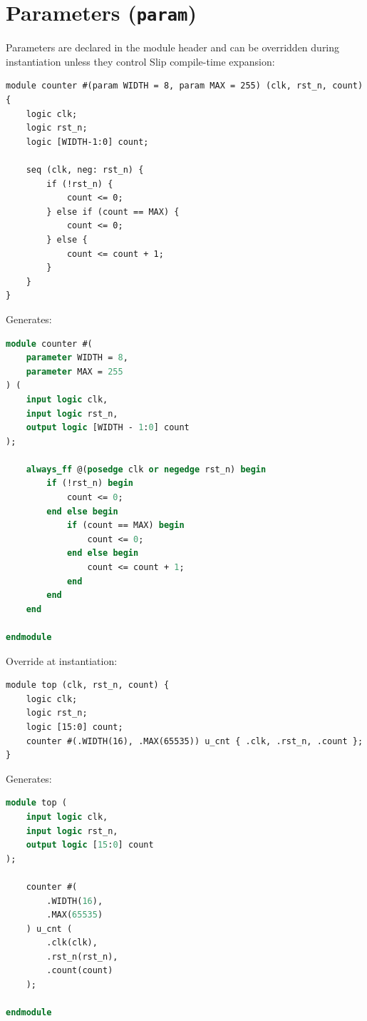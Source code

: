 \documentclass[lang=en,11pt]{elegantbook}
\newcommand{\code}[1]{\texttt{#1}}
\begin{document}
\section{Parameters (\code{param})}

Parameters are declared in the module header and can be overridden during instantiation unless they control Slip compile-time expansion:

\begin{lstlisting}[language=Slip]
module counter #(param WIDTH = 8, param MAX = 255) (clk, rst_n, count) {
    logic clk;
    logic rst_n;
    logic [WIDTH-1:0] count;

    seq (clk, neg: rst_n) {
        if (!rst_n) {
            count <= 0;
        } else if (count == MAX) {
            count <= 0;
        } else {
            count <= count + 1;
        }
    }
}
\end{lstlisting}

Generates:

\begin{lstlisting}[language=SystemVerilog]
module counter #(
    parameter WIDTH = 8,
    parameter MAX = 255
) (
    input logic clk,
    input logic rst_n,
    output logic [WIDTH - 1:0] count
);

    always_ff @(posedge clk or negedge rst_n) begin
        if (!rst_n) begin
            count <= 0;
        end else begin
            if (count == MAX) begin
                count <= 0;
            end else begin
                count <= count + 1;
            end
        end
    end

endmodule
\end{lstlisting}

Override at instantiation:

\begin{lstlisting}[language=Slip]
module top (clk, rst_n, count) {
    logic clk;
    logic rst_n;
    logic [15:0] count;
    counter #(.WIDTH(16), .MAX(65535)) u_cnt { .clk, .rst_n, .count };
}
\end{lstlisting}

Generates:

\begin{lstlisting}[language=SystemVerilog]
module top (
    input logic clk,
    input logic rst_n,
    output logic [15:0] count
);

    counter #(
        .WIDTH(16),
        .MAX(65535)
    ) u_cnt (
        .clk(clk),
        .rst_n(rst_n),
        .count(count)
    );

endmodule
\end{lstlisting}
\end{document}
